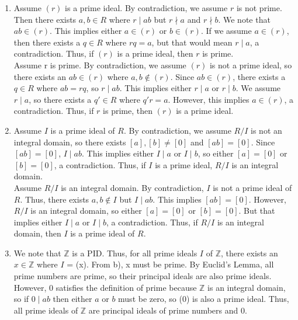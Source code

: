 \documentclass{article}
\begin{document}
\begin{enumerate}
\begin{enumerate}
    \item
    Assume $(r)$ is a prime ideal. By contradiction, we assume $r$ is not prime. Then there exists $a, b \in R$ where $r \mid ab$ but $r \nmid a$ and $r \nmid b$. We note that $ab \in (r)$. This implies either $a \in (r)$ or $b \in (r)$. If we assume $a \in (r)$, then there exists a $q \in R$ where $rq = a$, but that would mean $r \mid a$, a contradiction. Thus, if $(r)$ is a prime ideal, then $r$ is prime. \\

    Assume r is prime. By contradiction, we assume $(r)$ is not a prime ideal, so there exists an $ab \in (r)$ where $a,b \notin (r)$. Since $ab \in (r)$, there exists a $q \in R$ where $ab = rq$, so $r \mid ab$. This implies either $r \mid a$ or $r \mid b$. We assume $r \mid a$, so there exists a $q' \in R$ where $q'r = a$. However, this implies $a \in (r)$, a contradiction. Thus, if $r$ is prime, then $(r)$ is a prime ideal. \\

    \item
    Assume $I$ is a prime ideal of $R$. By contradiction, we assume $R/I$ is not an integral domain, so there exists $[a], [b] \neq [0]$ and $[ab] = [0]$. Since $[ab] = [0]$, $I \mid ab$. This implies either $I\mid a$ or $I \mid b$, so either $[a] = [0]$ or $[b] = [0]$, a contradiction. Thus, if $I$ is a prime ideal, $R/I$ is an integral domain. \\

    Assume $R/I$ is an integral domain. By contradiction, $I$ is not a prime ideal of $R$. Thus, there exists $a,b \notin I$ but $I \mid ab$. This implies $[ab] = [0]$. However, $R/I$ is an integral domain, so either $[a] = [0]$ or $[b] = [0]$. But that implies either $I \mid a$ or $I \mid b$, a contradiction. Thus, if $R/I$ is an integral domain, then $I$ is a prime ideal of $R$.\\

    \item
    We note that $\mathbb{Z}$ is a PID. Thus, for all prime ideals $I$ of $\mathbb{Z}$, there exists an $x \in \mathbb{Z}$ where $I$ = (x). From b), x must be prime. By Euclid's Lemma, all prime numbers are prime, so their principal ideals are also prime ideals. However, 0 satisfies the definition of prime because $\mathbb{Z}$ is an integral domain, so if $0 \mid ab$ then either $a$ or $b$ must be zero, so (0) is also a prime ideal. Thus, all prime ideals of $\mathbb{Z}$ are principal ideals of prime numbers and 0. \\


\end{enumerate}
\end{enumerate}
\end{document}
